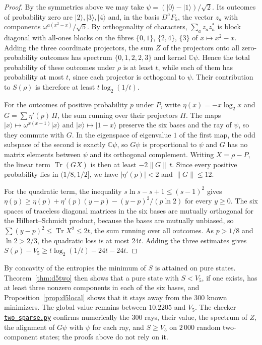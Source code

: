 \documentclass[11pt,a4paper]{article}
\theoremstyle{plain}
\DeclareMathOperator{\Tr}{Tr}
\newcommand{\C}{\mathbb C}
\newcommand{\ket}[1]{\lvert#1\rangle}
\newcommand{\repo}{https://github.com/jpbruneton/open_quantum_problems/blob/main/research/entries/complete-mub-entropy-ququart}
\begin{document}
\begin{proof}
By the symmetries above we may take $\psi=(\ket0-\ket1)/\sqrt2$. Its outcomes
of probability zero are $\ket2,\ket3,\ket4$ and, in the basis $D^aF_5$, the
vector $z_a$ with components $\omega^{a(x^2-x)}/\sqrt5$. By orthogonality of
characters, $\sum_az_az_a^*$ is block diagonal with all-ones blocks on the
fibres $\{0,1\}$, $\{2,4\}$, $\{3\}$ of $x\mapsto x^2-x$. Adding the three
coordinate projectors, the sum $Z$ of the projectors onto all zero-probability
outcomes has spectrum $\{0,1,2,2,3\}$ and kernel $\C\psi$. Hence the total
probability of these outcomes under $\rho$ is at least $t$, while each of them
has probability at most $t$, since each projector is orthogonal to $\psi$.
Their contribution to $S(\rho)$ is therefore at least $t\log_2(1/t)$.

For the outcomes of positive probability $p$ under $P$, write
$\eta(x)=-x\log_2x$ and $G=\sum\eta'(p)\,\Pi$, the sum running over their
projectors $\Pi$. The maps $\ket x\mapsto\omega^{x(x-1)}\ket x$ and
$\ket x\mapsto\ket{1-x}$ preserve the six bases and the ray of $\psi$, so they
commute with $G$. In the eigenspace of eigenvalue $1$ of the first map, the
odd subspace of the second is exactly $\C\psi$, so $G\psi$ is proportional to
$\psi$ and $G$ has no matrix elements between $\psi$ and its orthogonal
complement. Writing $X=\rho-P$, the linear term $\Tr(GX)$ is then at least
$-2\|G\|\,t$. Since every positive probability lies in $(1/8,1/2]$, we have
$|\eta'(p)|<2$ and $\|G\|\le12$.

For the quadratic term, the inequality $s\ln s-s+1\le(s-1)^2$ gives
$\eta(y)\ge\eta(p)+\eta'(p)(y-p)-(y-p)^2/(p\ln2)$ for every $y\ge0$. The six
spaces of traceless diagonal matrices in the six bases are mutually orthogonal
for the Hilbert--Schmidt product, because the bases are mutually unbiased, so
$\sum(y-p)^2\le\Tr X^2\le2t$, the sum running over all outcomes. As $p>1/8$
and $\ln2>2/3$, the quadratic loss is at most $24t$. Adding the three
estimates gives $S(\rho)-V_5\ge t\log_2(1/t)-24t-24t$.
\end{proof}

By concavity of the entropies the minimum of $S$ is attained on pure states.
Theorem~\ref{thm:d5two} then shows that a pure state with $S<V_5$, if one
exists, has at least three nonzero components in each of the six bases, and
Proposition~\ref{prop:d5local} shows that it stays away from the $300$ known
minimizers. The global value remains between $10.2205$ and $V_5$. The checker
\href{\repo/checks/two_sparse.py}{\texttt{two\_sparse.py}} confirms numerically
the $300$ rays, their value, the spectrum of $Z$, the alignment of $G\psi$ with
$\psi$ for each ray, and $S\ge V_5$ on $2\,000$ random two-component states;
the proofs above do not rely on it.
\end{document}
